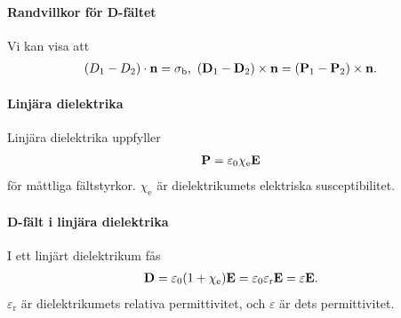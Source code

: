 \paragraph{Randvillkor för D-fältet}
Vi kan visa att
\begin{align*}
	(D_{1} - D_{2})\cdot\vb{n} = \sigma_{\text{b}},\ (\vb{D}_{1} - \vb{D}_{2})\times\vb{n} = (\vb{P}_{1} - \vb{P}_{2})\times\vb{n}.
\end{align*}

\paragraph{Linjära dielektrika}
Linjära dielektrika uppfyller
\begin{align*}
	\vb{P} = \varepsilon_{0}\chi_{\text{e}}\vb{E}
\end{align*}
för måttliga fältstyrkor. $\chi_{\text{e}}$ är dielektrikumets elektriska susceptibilitet.

\paragraph{D-fält i linjära dielektrika}
I ett linjärt dielektrikum fås
\begin{align*}
	\vb{D} = \varepsilon_{0}(1 + \chi_{\text{e}})\vb{E} = \varepsilon_{0}\varepsilon_{\text{r}}\vb{E} = \varepsilon\vb{E}.
\end{align*}
$\varepsilon_{\text{r}}$ är dielektrikumets relativa permittivitet, och $\varepsilon$ är dets permittivitet.

